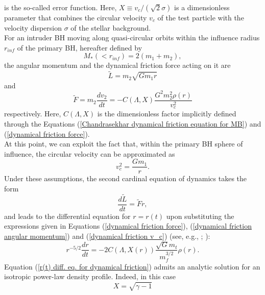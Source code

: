 \documentclass[12pt,twoside,openany]{book}
\begin{document}
is the so-called error function. Here, $X\equiv v_c/(\sqrt{2}\sigma)$ is a dimensionless parameter that combines the circular velocity $v_c$ of the test particle with the velocity dispersion $\sigma$ of the stellar background.\\For an intruder BH moving along quasi-circular orbits within the influence radius $r_{inf}$ of the primary BH, hereafter defined by
\begin{equation}
\label{r_inf definition}
 M_*(<r_{inf})=2(m_1+m_2),
\end{equation}
the angular momentum and the dynamical friction force acting on it are
\begin{equation}\label{dynamical friction angular momentum}
    \tilde{L}=m_2\sqrt{Gm_1r}
\end{equation}
and
\begin{equation}\label{dynamical friction force}
  \tilde{F}=m_2\frac{dv_2}{dt}=-C(\Lambda,X)\frac{G^2m_2^2\rho(r)}{v_c^2}
\end{equation}
respectively. Here, $C(\Lambda,X)$ is the dimensionless factor implicitly defined through the Equations (\ref{Chandrasekhar dynamical friction equation for MB}) and (\ref{dynamical friction force}).\\At this point, we can exploit the fact that, within the primary BH sphere of influence, the circular velocity can be approximated as
\begin{equation}\label{dynamical friction v_c}
 v_c^2=\frac{Gm_1}{r}.
\end{equation}
Under these assumptions, the second cardinal equation of dynamics takes the form
\begin{equation}\label{dynamical friction angular momentum loss eq}
    \frac{d\tilde{L}}{dt}=\tilde{F}r,
\end{equation}
and leads to the differential equation for \(r=r(t)\) upon substituting the expressions given in Equations (\ref{dynamical friction force}), (\ref{dynamical friction angular momentum}) and (\ref{dynamical friction v_c}) (see, e.g., \citealt{Baumgardt_2006}; \citealt{Gualandris_2022}):
\begin{equation}\label{r(t) diff. eq. for dynamical friction}
    r^{-5/2}\frac{dr}{dt}=-2C(\Lambda,X(r))\frac{\sqrt{G}m_t}{m_f^{3/2}}\rho(r).
\end{equation}
Equation (\ref{r(t) diff. eq. for dynamical friction}) admits an analytic solution for an isotropic power-law density profile. Indeed, in this case
\begin{equation}
 X=\sqrt{\gamma-1}
\end{equation}
\end{document}
